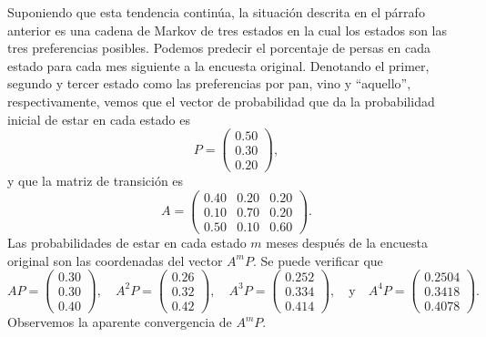 \documentclass[12pt,a4paper]{book}
\begin{document}
\begin{ejemplo}
        Suponiendo que esta tendencia continúa, la situación descrita en el párrafo anterior es una cadena de Markov de tres estados en la cual los estados son las tres preferencias posibles. Podemos predecir el porcentaje de persas en cada estado para cada mes siguiente a la encuesta original. Denotando el primer, segundo y tercer estado como las preferencias por pan, vino y \textquotedblleft aquello\textquotedblright, respectivamente, vemos que el vector de probabilidad que da la probabilidad inicial de estar en cada estado es
        \begin{equation*}
            P=\begin{pmatrix}0.50\\0.30\\0.20\end{pmatrix},
        \end{equation*}
        y que la matriz de transición es
        \begin{equation*}
            A=\begin{pmatrix}0.40&0.20&0.20\\0.10&0.70&0.20\\0.50&0.10&0.60\end{pmatrix}.
        \end{equation*}
        Las probabilidades de estar en cada estado $m$ meses después de la encuesta original son las coordenadas del vector $A^mP$. Se puede verificar que
        \begin{equation*}
            AP=\begin{pmatrix}0.30\\0.30\\0.40\end{pmatrix}, \quad A^2P=\begin{pmatrix}0.26\\0.32\\0.42\end{pmatrix}, \quad A^3P=\begin{pmatrix}0.252\\0.334\\0.414\end{pmatrix}, \quad\text{y}\quad A^4P=\begin{pmatrix}0.2504\\0.3418\\0.4078\end{pmatrix}.
        \end{equation*}
        Observemos la aparente convergencia de $A^mP$.


\end{ejemplo}
\end{document}
